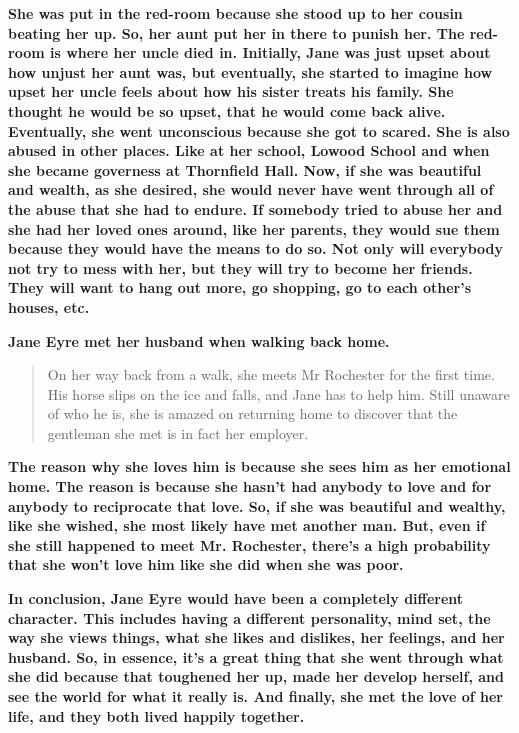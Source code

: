 \noindent \textbf{She was put in the red-room because she stood up to her cousin
  beating her up. So, her aunt put her in there to punish her. The red-room is
  where her uncle died in. Initially, Jane was just upset about how unjust her
  aunt was, but eventually, she started to imagine how upset her uncle feels
  about how his sister treats his family. She thought he would be so upset, that
  he would come back alive. Eventually, she went unconscious because she got to
  scared. She is also abused in other places. Like at her school, Lowood
  School and when she became governess at Thornfield Hall. Now, if she was
  beautiful and wealth, as she desired, she would never have went through all of
  the abuse that she had to endure. If somebody tried to abuse her and she had
  her loved ones around, like her parents, they would sue them because they would
  have the means to do so. Not only will everybody not try to mess with her, but
  they will try to become her friends. They will want to hang out more, go
  shopping, go to each other's houses, etc.}

\textbf{Jane Eyre met her husband when walking back home.}

\begin{quotation}
  On her way back from a walk, she meets Mr Rochester for the first time. His
  horse slips on the ice and falls, and Jane has to help him. Still unaware of who
  he is, she is amazed on returning home to discover that the gentleman she met is
  in fact her employer. \cite{charlotte_project_1998}
\end{quotation}

\noindent \textbf{The reason why she loves him is because she sees him as her emotional
  home. The reason is because she hasn't had anybody to love and for anybody to
  reciprocate that love. So, if she was beautiful and wealthy, like she wished,
  she most likely have met another man. But, even if she still happened to meet
  Mr. Rochester, there's a high probability that she won't love him like she did
  when she was poor.}

\textbf{In conclusion, Jane Eyre would have been a completely different
  character. This includes having a different personality, mind set, the way she
  views things, what she likes and dislikes, her feelings, and her husband. So,
  in essence, it's a great thing that she went through what she did because that
  toughened her up, made her develop herself, and see the world for what it really
  is. And finally, she met the love of her life, and they both lived happily
  together.}

